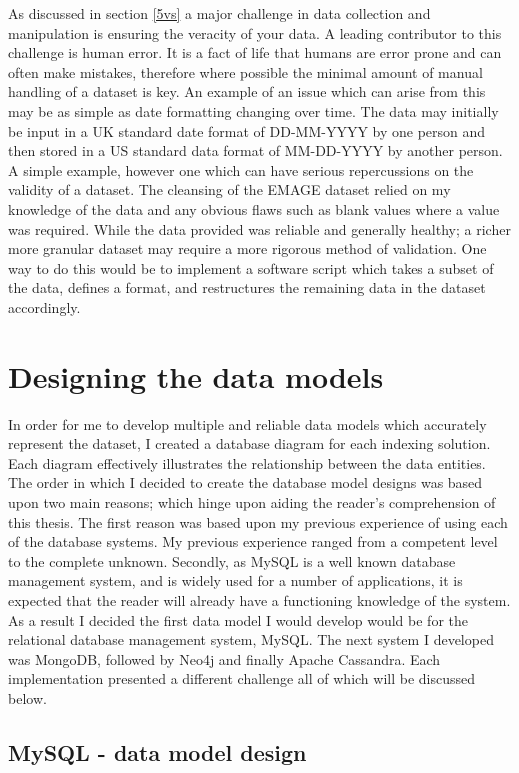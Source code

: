 As discussed in section \ref{5vs} a major challenge in data collection and manipulation is ensuring the veracity of your data. A leading contributor to this challenge is human error. It is a fact of life that humans are error prone and can often make mistakes, therefore where possible the minimal amount of manual handling of a dataset is key. An example of an issue which can arise from this may be as simple as date formatting changing over time. The data may initially be input in a UK standard date format of DD-MM-YYYY by one person and then stored in a US standard data format of MM-DD-YYYY by another person. A simple example, however one which can have serious repercussions on the validity of a dataset. The cleansing of the EMAGE dataset relied on my knowledge of the data and any obvious flaws such as blank values where a value was required. While the data provided was reliable and generally healthy; a richer more granular dataset may require a more rigorous method of validation. One way to do this would be to implement a software script which takes a subset of the data, defines a format, and restructures the remaining data in the dataset accordingly.

\section{Designing the data models}\label{dbdesign}

In order for me to develop multiple and reliable data models which accurately represent the dataset, I created a database diagram for each indexing solution. Each diagram effectively illustrates the relationship between the data entities. The order in which I decided to create the database model designs was based upon two main reasons; which hinge upon aiding the reader's comprehension of this thesis. The first reason was based upon my previous experience of using each of the database systems. My previous experience ranged from a competent level to the complete unknown. Secondly, as MySQL is a well known database management system, and is widely used for a number of applications, it is expected that the reader will already have a functioning knowledge of the system. As a result I decided the first data model I would develop would be for the relational database management system, MySQL. The next system I developed was MongoDB, followed by Neo4j and finally Apache Cassandra. Each implementation presented a different challenge all of which will be discussed below.

\subsection{MySQL - data model design}\label{mysqldesign}

